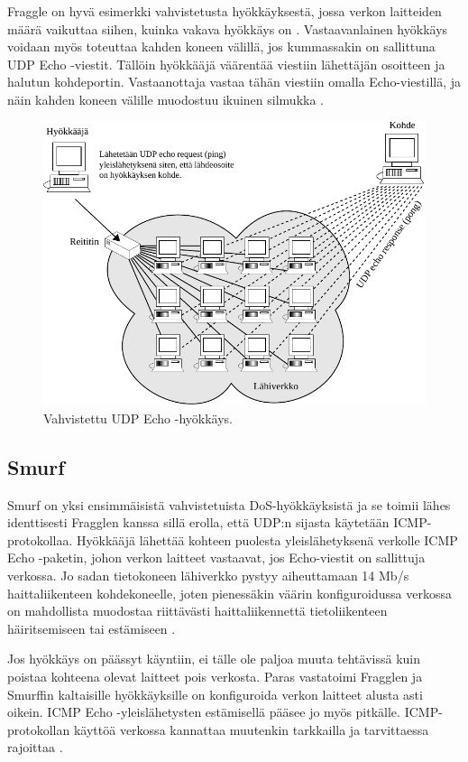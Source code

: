 Fraggle on hyvä esimerkki vahvistetusta hyökkäyksestä, jossa verkon
laitteiden määrä vaikuttaa siihen, kuinka vakava hyökkäys on
\cite{WEBS}. Vastaavanlainen hyökkäys voidaan myös toteuttaa kahden
koneen välillä, jos kummassakin on sallittuna UDP Echo
-viestit. Tällöin hyökkääjä väärentää viestiin lähettäjän osoitteen ja
halutun kohdeportin. Vastaanottaja vastaa tähän viestiin omalla
Echo-viestillä, ja näin kahden koneen välille muodostuu ikuinen
silmukka \cite{TCP}.

\begin{figure}[htp]
\centering
\includegraphics[width=13cm]{pics/fraggle.pdf}
\caption{Vahvistettu UDP Echo -hyökkäys.}
\label{fraggle}
\end{figure}

\subsection{Smurf}

Smurf on yksi ensimmäisistä vahvistetuista DoS-hyökkäyksistä ja se
toimii lähes identtisesti Fragglen kanssa sillä erolla, että UDP:n
sijasta käytetään ICMP-\-protokollaa. Hyökkääjä lähettää kohteen
puolesta yleislähetyksenä verkolle ICMP Echo -paketin, johon verkon
laitteet vastaavat, jos Echo-viestit on sallittuja verkossa. Jo sadan
tietokoneen lähiverkko pystyy aiheuttamaan 14 Mb/s haittaliikenteen
kohdekoneelle, joten pienessäkin väärin konfiguroidussa verkossa
on mahdollista muodostaa riittävästi haittaliikennettä tietoliikenteen
häiritsemiseen tai estämiseen \cite{Hacking}.

Jos hyökkäys on päässyt käyntiin, ei tälle ole paljoa muuta tehtävissä
kuin poistaa kohteena olevat laitteet pois verkosta. Paras vastatoimi
Fragglen ja Smurffin kaltaisille hyökkäyksille on konfiguroida verkon
laitteet alusta asti oikein. ICMP Echo -yleislähetysten estämisellä
pääsee jo myös pitkälle. ICMP-protokollan käyttöä verkossa kannattaa
muutenkin tarkkailla ja tarvittaessa rajoittaa \cite{Hacking}.

